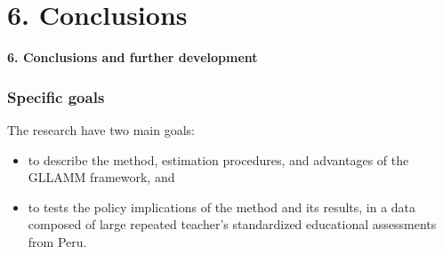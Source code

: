 \documentclass[arial,12pt,xcolor=dvipsnames]{beamer}
\begin{document}
\section{6. Conclusions}
%
\begin{frame}
	\textbf{6. Conclusions and further development}
\end{frame}
%
\begin{frame}
	\frametitle{Specific goals}
	The research have two main goals:
	\begin{itemize}
		\item to describe the method, estimation procedures, and advantages of the GLLAMM framework, and 
		\item to tests the policy implications of the method and its results, in a data composed of large repeated teacher's standardized educational assessments from Peru. 
	\end{itemize}
\end{frame}
%
%
\end{document}
